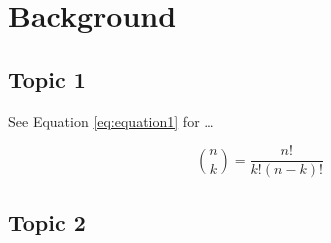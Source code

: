 \section{Background}
\label{sec:background}

\lipsum

\subsection{Topic 1}
\label{sec:topic1}

\lipsum

See Equation \ref{eq:equation1} for \dots

\begin{equation}
  \binom{n}{k} = \frac{n!}{k!(n-k)!}
  \label{eq:equation1}
\end{equation}

\lipsum

\subsection{Topic 2}
\label{sec:topic2}

\lipsum
